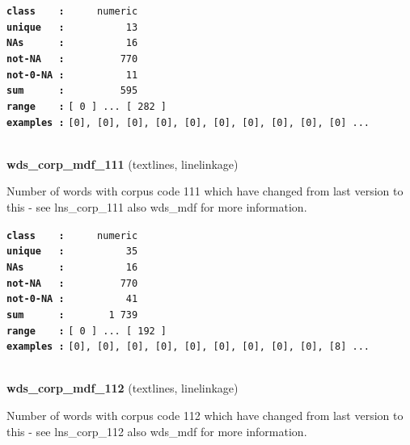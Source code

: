 \documentclass[]{article}
\begin{document}
\textbf{\texttt{class\ \ \ \ :}} \texttt{~~~~~numeric}\\
\textbf{\texttt{unique\ \ \ :}} \texttt{~~~~~~~~~~13}\\
\textbf{\texttt{NAs\ \ \ \ \ \ :}} \texttt{~~~~~~~~~~16}\\
\textbf{\texttt{not-NA\ \ \ :}} \texttt{~~~~~~~~~770}\\
\textbf{\texttt{not-0-NA\ :}} \texttt{~~~~~~~~~~11}\\
\textbf{\texttt{sum\ \ \ \ \ \ :}} \texttt{~~~~~~~~~595}\\
\textbf{\texttt{range\ \ \ \ :}}
\texttt{{[}\ 0\ {]}\ ...\ {[}\ 282\ {]}}\\
\textbf{\texttt{examples\ :}}
\texttt{{[}0{]},\ {[}0{]},\ {[}0{]},\ {[}0{]},\ {[}0{]},\ {[}0{]},\ {[}0{]},\ {[}0{]},\ {[}0{]},\ {[}0{]}\ ...}\\

~

\textbf{wds\_corp\_mdf\_111} (textlines, linelinkage)

Number of words with corpus code 111 which have changed from last
version to this - see lns\_corp\_111 also wds\_mdf for more information.

\textbf{\texttt{class\ \ \ \ :}} \texttt{~~~~~numeric}\\
\textbf{\texttt{unique\ \ \ :}} \texttt{~~~~~~~~~~35}\\
\textbf{\texttt{NAs\ \ \ \ \ \ :}} \texttt{~~~~~~~~~~16}\\
\textbf{\texttt{not-NA\ \ \ :}} \texttt{~~~~~~~~~770}\\
\textbf{\texttt{not-0-NA\ :}} \texttt{~~~~~~~~~~41}\\
\textbf{\texttt{sum\ \ \ \ \ \ :}} \texttt{~~~~~~~1~739}\\
\textbf{\texttt{range\ \ \ \ :}}
\texttt{{[}\ 0\ {]}\ ...\ {[}\ 192\ {]}}\\
\textbf{\texttt{examples\ :}}
\texttt{{[}0{]},\ {[}0{]},\ {[}0{]},\ {[}0{]},\ {[}0{]},\ {[}0{]},\ {[}0{]},\ {[}0{]},\ {[}0{]},\ {[}8{]}\ ...}\\

~

\textbf{wds\_corp\_mdf\_112} (textlines, linelinkage)

Number of words with corpus code 112 which have changed from last
version to this - see lns\_corp\_112 also wds\_mdf for more information.
\end{document}
